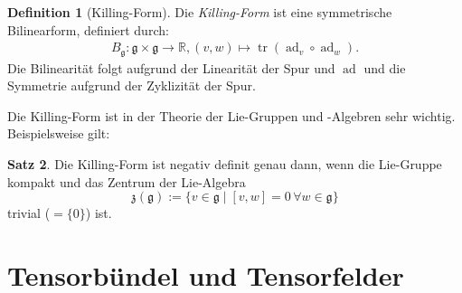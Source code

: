 \documentclass[a4paper]{scrreprt}
\numberwithin{equation}{chapter}
\DeclareMathOperator{\ad}{ad}
\DeclareMathOperator{\tr}{tr}
\newcommand{\R}{\mathbb{R}}
\theoremstyle{definition}
\newtheorem{defn}{Definition}[section]
\newtheorem{satz}[defn]{Satz}
\begin{document}
		\begin{defn}[Killing-Form]
			Die \emph{Killing-Form} ist eine symmetrische Bilinearform, definiert durch:
			\begin{align*}
				B_{\mathfrak{g}}\colon\mathfrak{g}\times\mathfrak{g}\rightarrow\R, (v,w)\mapsto \tr(\ad_v\circ\ad_w).
			\end{align*}
			Die Bilinearität folgt aufgrund der Linearität der Spur und $\ad$ und die Symmetrie aufgrund der Zyklizität der Spur.
		\end{defn}
		Die Killing-Form ist in der Theorie der Lie-Gruppen und -Algebren sehr wichtig. Beispielsweise gilt:
		\begin{satz}
			Die Killing-Form ist negativ definit genau dann, wenn die Lie-Gruppe kompakt und das Zentrum der Lie-Algebra
			\begin{equation*}
				\mathfrak{z}(\mathfrak{g}):=\lbrace v\in\mathfrak{g}\mid \left[v,w\right]=0\,\forall w\in\mathfrak{g}\rbrace
			\end{equation*}
			trivial ($=\lbrace 0\rbrace$) ist.
		\end{satz}
		
\chapter{Tensorbündel und Tensorfelder}
\end{document}
